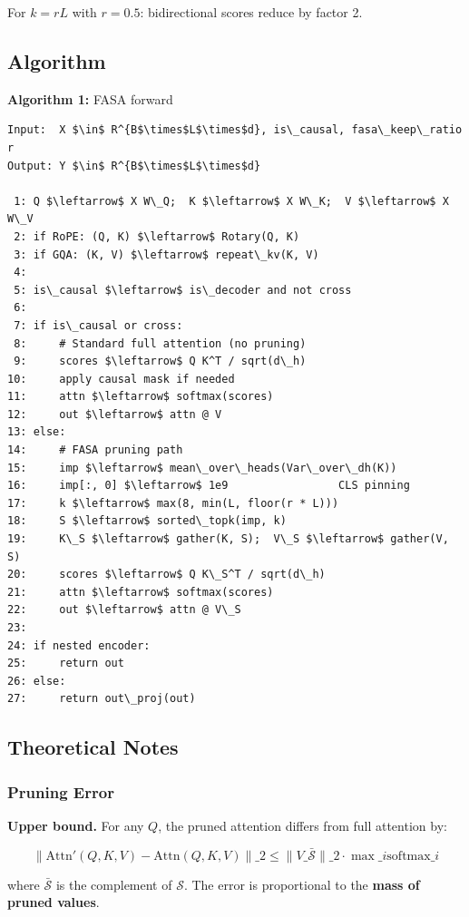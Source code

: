 For $k = rL$ with $r = 0.5$: bidirectional scores reduce by factor 2.

\subsection{Algorithm}

\textbf{Algorithm 1:} FASA forward
\begin{lstlisting}
Input:  X $\in$ R^{B$\times$L$\times$d}, is\_causal, fasa\_keep\_ratio r
Output: Y $\in$ R^{B$\times$L$\times$d}

 1: Q $\leftarrow$ X W\_Q;  K $\leftarrow$ X W\_K;  V $\leftarrow$ X W\_V
 2: if RoPE: (Q, K) $\leftarrow$ Rotary(Q, K)
 3: if GQA: (K, V) $\leftarrow$ repeat\_kv(K, V)
 4:
 5: is\_causal $\leftarrow$ is\_decoder and not cross
 6:
 7: if is\_causal or cross:
 8:     # Standard full attention (no pruning)
 9:     scores $\leftarrow$ Q K^T / sqrt(d\_h)
10:     apply causal mask if needed
11:     attn $\leftarrow$ softmax(scores)
12:     out $\leftarrow$ attn @ V
13: else:
14:     # FASA pruning path
15:     imp $\leftarrow$ mean\_over\_heads(Var\_over\_dh(K))
16:     imp[:, 0] $\leftarrow$ 1e9                 CLS pinning
17:     k $\leftarrow$ max(8, min(L, floor(r * L)))
18:     S $\leftarrow$ sorted\_topk(imp, k)
19:     K\_S $\leftarrow$ gather(K, S);  V\_S $\leftarrow$ gather(V, S)
20:     scores $\leftarrow$ Q K\_S^T / sqrt(d\_h)
21:     attn $\leftarrow$ softmax(scores)
22:     out $\leftarrow$ attn @ V\_S
23:
24: if nested encoder:
25:     return out
26: else:
27:     return out\_proj(out)
\end{lstlisting}

\subsection{Theoretical Notes}

\subsubsection{Pruning Error}

\textbf{Upper bound.} For any $Q$, the pruned attention differs from full attention by:

\[
\|\text{Attn}'(Q, K, V) - \text{Attn}(Q, K, V)\|\_2 \leq \|V\_{\bar{\mathcal{S}}}\|\_2 \cdot \max\_i \text{softmax}\_i
\tag{4.8}
\]

where $\bar{\mathcal{S}}$ is the complement of $\mathcal{S}$. The error is 
proportional to the \textbf{mass of pruned values}.


